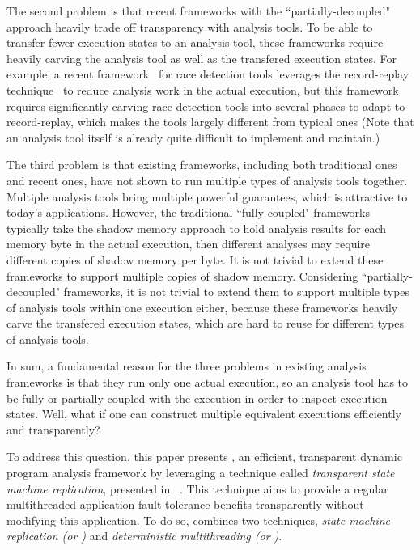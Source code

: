 The second problem is that recent frameworks with the ``partially-decoupled"
approach heavily trade off transparency with analysis tools. To be able to
transfer fewer execution states to an analysis tool, these frameworks require
heavily carving the analysis tool as well as the transfered execution states.
For example, a recent framework~\cite{wester:parallelizing:asplos13} for race
detection tools leverages the record-replay
technique~\cite{scribe:sigmetrics2010, respec:asplos10, racepro:sosp11} to
reduce analysis work in the actual execution, but this framework
requires significantly carving race detection tools into several phases to adapt
to record-replay, which makes the tools largely different from typical ones
(Note that an analysis tool itself is already quite difficult to implement and
maintain.)


The third problem is that existing frameworks, including both traditional ones
and recent ones, have not shown to run multiple types of analysis tools 
together. Multiple analysis tools bring multiple powerful
guarantees, which is attractive to today's applications. However, the
traditional ``fully-coupled" frameworks typically take the shadow memory 
approach to hold analysis results for each memory byte in the actual execution, 
then different analyses may require different copies of shadow memory per byte. 
It is not trivial to extend these frameworks to support multiple copies of 
shadow memory. Considering ``partially-decoupled" frameworks, it is not trivial 
to extend them to support multiple types of analysis tools within one execution 
either, because these frameworks heavily carve the transfered execution states, 
which are hard to reuse for different types of analysis tools.


In sum, a fundamental reason for the three problems in existing analysis 
frameworks is that they run only one actual execution, so an analysis tool has
to be fully or partially coupled with the execution in order to inspect
execution states. Well, what if one can construct multiple equivalent
executions efficiently and transparently?




To address this question, this paper presents \xxx, an efficient, 
transparent dynamic program analysis framework by leveraging a technique called 
\emph{transparent state machine replication}, presented in 
\repbox~\cite{repbox:sosp15}. This technique aims to provide a regular 
multithreaded application fault-tolerance benefits transparently without modifying 
this application. To do so, \repbox combines two techniques, \emph{state machine replication (or 
\smr)} and \emph{deterministic multithreading (or \dmt)}.


